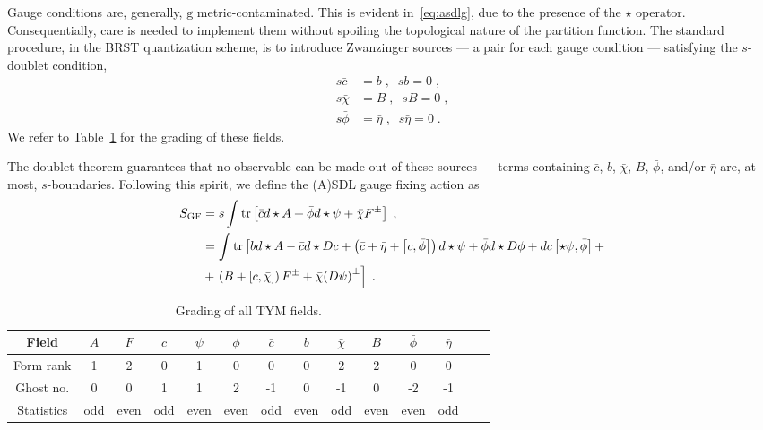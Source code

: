 \documentclass[../main/tex]{subfiles}
\begin{document}
Gauge conditions are, generally, $ \mathrm{g} $ metric-contaminated. This is evident in~\eqref{eq:asdlg}, due to the presence of the $\star$ operator. Consequentially, care is needed to implement them without spoiling the topological nature of the partition function. The standard procedure, in the BRST quantization scheme, is to introduce Zwanzinger sources --- a pair for each gauge condition --- satisfying the $s$-doublet condition,
\begin{subequations}\label{eq:anti-ghost_lautrup-nakanishi}
  \begin{align}
    s \bar{ c }  & = b \;, \;\; s b  = 0 \;,                    \\
    s \bar{\chi} & = B \;, \;\; s B        = 0 \;,              \\
    s \bar{\phi} & = \bar{\eta} \;, \;\; s \bar{ \eta } = 0 \;.
  \end{align}
\end{subequations}
We refer to Table~\ref{tab:tym-grading} for the grading of these fields.

The doublet theorem guarantees that no observable can be made out of these sources --- terms containing $\bar{c}$, $b$, $\bar{\chi}$, $B$, $\bar{\phi}$, and/or $\bar{\eta}$ are, at most, $s$-boundaries. Following this spirit, we define the (A){}SDL gauge fixing action as
\begin{subequations}\label{eq:tym-gf-action}
  \begin{align}
    S_{\text{GF}} & = s \int \operatorname{tr} \left[ \bar{c} d \star A + \bar{\phi} d \star \psi + \bar{\chi} F^{\pm} \right] \;,                                                                                                                                 \\
                  & =  \int \operatorname{tr} \left[ b d \star A - \bar{c} d \star Dc + \left( \bar{c} + \bar{\eta} + \left[ c,\bar{\phi} \right] \right) d \star \psi + \bar{\phi} d \star D \phi + d c \left[ \star \psi ,\bar{\phi} \right] + \right. \nonumber \\
                  & + \left. \left( B + \left[ c,\bar{\chi} \right] \right) F^{\pm} + \bar{\chi} {\left( D \psi \right)}^{ \pm } \right] \;.
  \end{align}
\end{subequations}

\begin{table}[htpb]
  \caption{Grading of all TYM fields.}%
  \label{tab:tym-grading}
  \begin{tabular}{cccccccccccccc}
    \toprule
    Field      & $A$ & $F$  & $c$ & $\psi$ & $\phi$ & $\bar{c}$ & $b$  & $\bar{\chi}$ & $B$  & $\bar{\phi}$ & $\bar{\eta}$ \\
    \midrule
    Form rank  & 1   & 2    & 0   & 1      & 0      & 0         & 0    & 2            & 2    & 0            & 0            \\
    Ghost no.  & 0   & 0    & 1   & 1      & 2      & -1        & 0    & -1           & 0    & -2           & -1           \\
    Statistics & odd & even & odd & even   & even   & odd       & even & odd          & even & even         & odd          \\
    \bottomrule
  \end{tabular}
\end{table}
\end{document}
